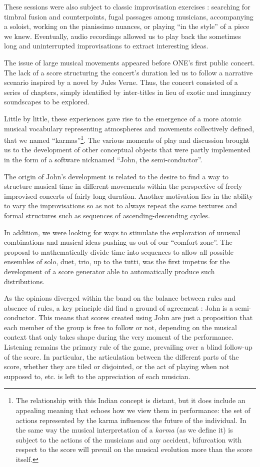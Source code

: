 These sessions were also subject to classic improvisation exercises : searching for timbral fusion and counterpoints, fugal passages among musicians, accompanying a soloist, working on the pianissimo nuances, or playing “in the style” of a piece we knew. Eventually, audio recordings allowed us to play back the sometimes long and uninterrupted improvisations to extract interesting ideas.

The issue of large musical movements appeared before ONE's first public concert. The lack of a score structuring the concert's duration led us to follow a narrative scenario inspired by a novel by Jules Verne. Thus, the concert consisted of a series of chapters, simply identified by inter-titles in lieu of exotic and imaginary soundscapes to be explored.

Little by little, these experiences gave rise to the emergence of a more atomic musical vocabulary representing atmospheres and movements collectively defined, that we named “karmas”\footnote{The relationship with this Indian concept is distant, but it does include an appealing meaning that echoes how we view them in performance: the set of actions represented by the karma influences the future of the individual. In the same way the musical interpretation of a \textit{karma} (as we define it) is subject to the actions of the musicians and any accident, bifurcation with respect to the score will prevail on the musical evolution more than the score itself.}. The various moments of play and discussion brought us to the development of other conceptual objects that were partly implemented in the form of a software nicknamed “John, the semi-conductor”.

The origin of John's development is related to the desire to find a way to structure musical time in different movements within the perspective of freely improvised concerts of fairly long duration. Another motivation lies in the ability to vary the improvisations so as not to always repeat the same textures and formal structures such as sequences of ascending-descending cycles.

In addition, we were looking for ways to stimulate the exploration of unusual combinations and musical ideas pushing us out of our “comfort zone”. The proposal to mathematically divide time into sequences to allow all possible ensembles of solo, duet, trio, up to the tutti, was the first impetus for the development of a score generator able to automatically produce such distributions.

As the opinions diverged within the band on the balance between rules and absence of rules, a key principle did find a ground of agreement : John is a semi-conductor. This means that scores created using John are just a proposition that each member of the group is free to follow or not, depending on the musical context that only takes shape during the very moment of the performance. Listening remains the primary rule of the game, prevailing over a blind follow-up of the score. In particular, the articulation between the different parts of the score, whether they are tiled or disjointed, or the act of playing when not supposed to, etc. is left to the appreciation of each musician.

